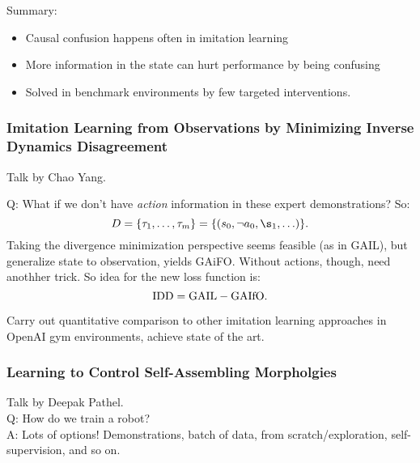 Summary:
\begin{itemize}
    \item Causal confusion happens often in imitation learning
    \item More information in the state can hurt performance by being confusing
    \item Solved in benchmark environments by few targeted interventions.
\end{itemize}


\subsubsection{Imitation Learning from Observations by Minimizing Inverse Dynamics Disagreement}

Talk by Chao Yang. \\


Q: What if we don't have {\it action} information in these expert demonstrations? So:
\[
D = \{\tau_1, \ldots, \tau_m\} = \{(s_0, \neg a_0, \s_1, \ldots)\}.
\]
Taking the divergence minimization perspective seems feasible (as in GAIL), but generalize state to observation, yields GAiFO. Without actions, though, need anothher trick. So idea for the new loss function is:
\[
\text{IDD} = \text{GAIL} -\text{GAIfO}.
\]


Carry out quantitative comparison to other imitation learning approaches in OpenAI gym environments, achieve state of the art. \\

\subsubsection{Learning to Control Self-Assembling Morpholgies}

Talk by Deepak Pathel. \\

Q: How do we train a robot? \\

A: Lots of options! Demonstrations, batch of data, from scratch/exploration, self-supervision, and so on. \\


